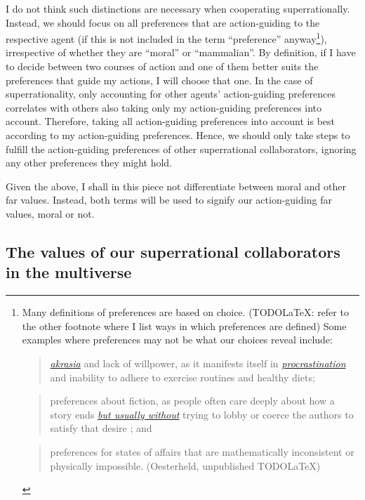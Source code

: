 I do not think such distinctions are necessary when cooperating
superrationally. Instead, we should focus on all preferences that are
action-guiding to the respective agent (if this is not included in the
term ``preference'' anyway\footnote{Many definitions of preferences are
  based on choice. (TODOLaTeX: refer to the other footnote where I list
  ways in which preferences are defined) Some examples where preferences
  may not be what our choices reveal include:

  \begin{quote}
  \href{https://en.wikipedia.org/wiki/Akrasia}{\emph{akrasia}} and lack
  of willpower, as it manifests itself in
  \href{https://en.wikipedia.org/wiki/Procrastination}{\emph{procrastination}}
  and inability to adhere to exercise routines and healthy diets;
  \end{quote}

  \begin{quote}
  preferences about fiction, as people often care deeply about how a
  story ends
  \href{http://briantomasik.com/collection-quick-observations/\#Taking_fiction_seriously}{\emph{but
  usually without}} trying to lobby or coerce the authors to satisfy
  that desire
  \parencite{Radford1975-my,noauthor_undated-sw}; and
  \end{quote}

  \begin{quote}
  preferences for states of affairs that are mathematically inconsistent
  or physically impossible. (Oesterheld, unpublished TODOLaTeX)
  \end{quote}}), irrespective of whether they are ``moral'' or
``mammalian''. By definition, if I have to decide between two courses of
action and one of them better suits the preferences that guide my
actions, I will choose that one. In the case of superrationality, only
accounting for other agents' action-guiding preferences correlates with
others also taking only my action-guiding preferences into account.
Therefore, taking all action-guiding preferences into account is best
according to my action-guiding preferences. Hence, we should only take
steps to fulfill the action-guiding preferences of other superrational
collaborators, ignoring any other preferences they might hold.

Given the above, I shall in this piece not differentiate between moral
and other far values. Instead, both terms will be used to signify our
action-guiding far values, moral or not.

\hypertarget{the-values-of-our-superrational-collaborators-in-the-multiverse}{\subsection{The
values of our superrational collaborators in the
multiverse}\label{the-values-of-our-superrational-collaborators-in-the-multiverse}}


